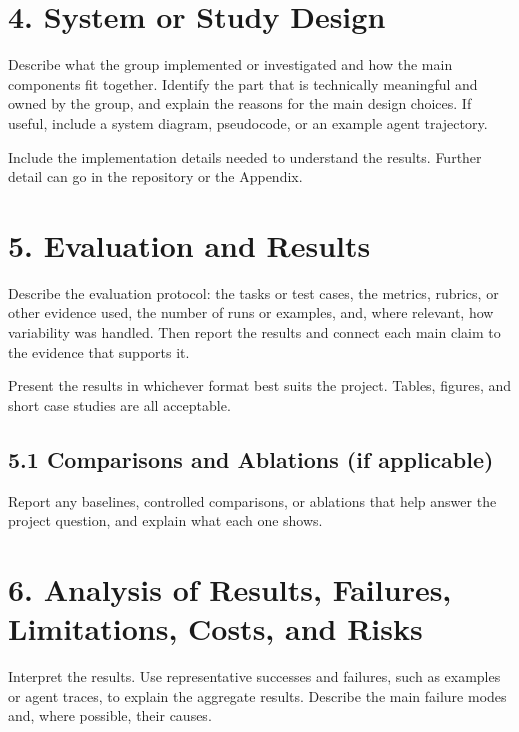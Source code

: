 \documentclass[11pt]{article}
\begin{document}
\section*{4. System or Study Design}

Describe what the group implemented or investigated and how the main components fit
together. Identify the part that is technically meaningful and owned by the group,
and explain the reasons for the main design choices. If useful, include a system
diagram, pseudocode, or an example agent trajectory.

Include the implementation details needed to understand the results. Further detail
can go in the repository or the Appendix.

\section*{5. Evaluation and Results}

Describe the evaluation protocol: the tasks or test cases, the metrics, rubrics, or
other evidence used, the number of runs or examples, and, where relevant, how
variability was handled. Then report the results and connect each main claim to the
evidence that supports it.

Present the results in whichever format best suits the project. Tables, figures,
and short case studies are all acceptable.

\subsection*{5.1 Comparisons and Ablations (if applicable)}

Report any baselines, controlled comparisons, or ablations that help answer the
project question, and explain what each one shows.

\section*{6. Analysis of Results, Failures, Limitations, Costs, and Risks}

Interpret the results. Use representative successes and failures, such as examples
or agent traces, to explain the aggregate results. Describe the main failure modes
and, where possible, their causes.
\end{document}
